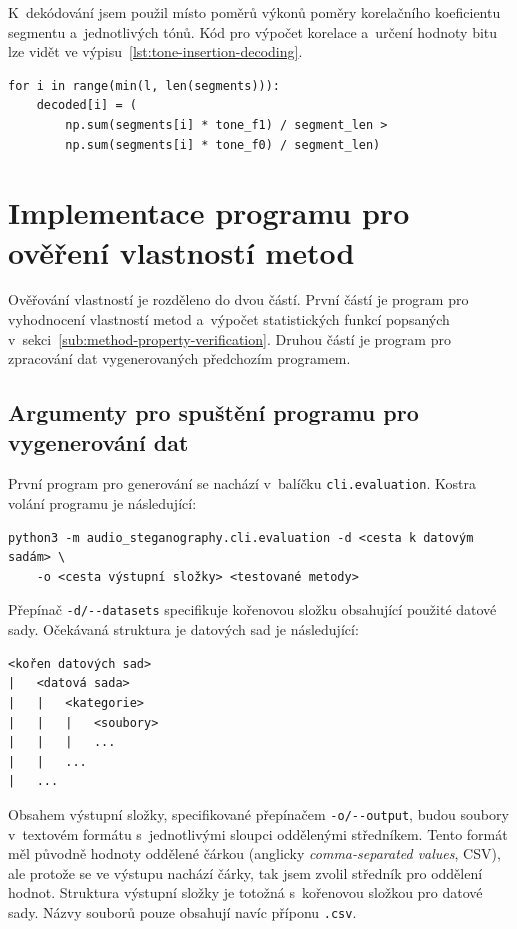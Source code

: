 K~dekódování jsem použil místo poměrů výkonů poměry korelačního koeficientu
segmentu a~jednotlivých tónů. Kód pro výpočet korelace a~určení hodnoty bitu
lze vidět ve výpisu~\ref{lst:tone-insertion-decoding}.

\begin{lstlisting}[language=PythonPlus, label={lst:tone-insertion-decoding},
caption={Výpočet korelace mezi segmenty a~tóny.}, float]
for i in range(min(l, len(segments))):
    decoded[i] = (
        np.sum(segments[i] * tone_f1) / segment_len >
        np.sum(segments[i] * tone_f0) / segment_len)
\end{lstlisting}

\section{Implementace programu pro ověření vlastností metod}
\label{sec:evaluation-program-implementation}

Ověřování vlastností je rozděleno do dvou částí. První částí je program pro
vyhodnocení vlastností metod a~výpočet statistických funkcí popsaných
v~sekci~\ref{sub:method-property-verification}. Druhou částí je program pro
zpracování dat vygenerovaných předchozím programem.

\subsection*{Argumenty pro spuštění programu pro vygenerování dat}
\label{sub:evaluation-program-tui-arguments}

První program pro generování se nachází v~balíčku \texttt{cli.evaluation}.
Kostra volání programu je následující:

\begin{verbatim}
python3 -m audio_steganography.cli.evaluation -d <cesta k datovým sadám> \
    -o <cesta výstupní složky> <testované metody>
\end{verbatim}

\noindent Přepínač \verb|-d/--datasets| specifikuje kořenovou složku obsahující
použité datové sady. Očekávaná struktura je datových sad je následující:

\begin{verbatim}
<kořen datových sad>
|   <datová sada>
|   |   <kategorie>
|   |   |   <soubory>
|   |   |   ...
|   |   ...
|   ...
\end{verbatim}

\noindent Obsahem výstupní složky, specifikované přepínačem \verb|-o/--output|,
budou soubory v~textovém formátu s~jednotlivými sloupci oddělenými středníkem.
Tento formát měl původně hodnoty oddělené čárkou (anglicky
\textit{comma-separated values}, CSV), ale protože se ve výstupu nachází čárky,
tak jsem zvolil středník pro oddělení hodnot. Struktura výstupní složky je
totožná s~kořenovou složkou pro datové sady. Názvy souborů pouze obsahují navíc
příponu \texttt{.csv}.

